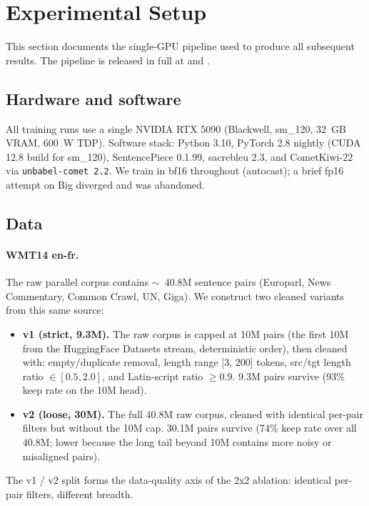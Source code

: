 \section{Experimental Setup}
\label{sec:setup}

This section documents the single-GPU pipeline used to produce all subsequent results. The pipeline is released in full at  and .

\subsection{Hardware and software}
All training runs use a single NVIDIA RTX 5090 (Blackwell, sm\_120, 32~GB VRAM, 600~W TDP). Software stack: Python 3.10, PyTorch 2.8 nightly (CUDA 12.8 build for sm\_120), SentencePiece 0.1.99, sacrebleu 2.3, and CometKiwi-22 via \texttt{unbabel-comet 2.2}. We train in bf16 throughout (autocast); a brief fp16 attempt on Big diverged and was abandoned.

\subsection{Data}
\paragraph{WMT14 en-fr.} The raw parallel corpus contains $\sim$~40.8M sentence pairs (Europarl, News Commentary, Common Crawl, UN, Giga). We construct two cleaned variants from this same source:
\begin{itemize}
\item \textbf{v1 (strict, 9.3M).} The raw corpus is capped at 10M pairs (the first 10M from the HuggingFace Datasets stream, deterministic order), then cleaned with: empty/duplicate removal, length range [3, 200] tokens, src/tgt length ratio $\in [0.5, 2.0]$, and Latin-script ratio $\geq 0.9$. 9.3M pairs survive (93\% keep rate on the 10M head).
\item \textbf{v2 (loose, 30M).} The full 40.8M raw corpus, cleaned with identical per-pair filters but without the 10M cap. 30.1M pairs survive (74\% keep rate over all 40.8M; lower because the long tail beyond 10M contains more noisy or misaligned pairs).
\end{itemize}
The v1 / v2 split forms the data-quality axis of the 2x2 ablation: identical per-pair filters, different breadth.


